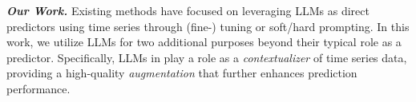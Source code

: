 \noindent\textit{\textbf{Our Work.}} Existing methods have focused on leveraging LLMs as direct predictors using time series through (fine-) tuning or soft/hard prompting. 
In this work, we utilize LLMs for two additional purposes beyond their typical role as a predictor.
Specifically, LLMs in \method play a role as a \textit{contextualizer} of time series data, providing a high-quality \textit{augmentation} that further enhances prediction performance.